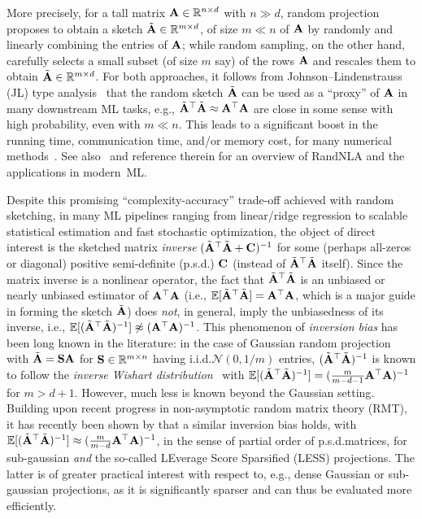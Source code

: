 \documentclass[11pt,a4paper]{article}
\begin{document}
More precisely, for a tall matrix $\mathbf{A} \in {\mathbb{R}}^{n \times d}$ with $n \gg d$, random projection proposes to obtain a sketch $\tilde {\mathbf{A}} \in {\mathbb{R}}^{m \times d}$, of size $m \ll n$ of $\mathbf{A}$ by randomly and linearly combining the entries of $\mathbf{A}$; while 
random sampling, on the other hand, carefully selects a small  subset (of size $m$ say) of the rows $\mathbf{A}$ and rescales them to obtain $\tilde {\mathbf{A}} \in {\mathbb{R}}^{m \times d}$.
For both approaches, it follows from Johnson--Lindenstrauss (JL) type analysis~\citep{johnson1984extensions} that the random sketch $\tilde {\mathbf{A}}$ can be used as a ``proxy'' of $\mathbf{A}$ in many downstream ML tasks, e.g., $\tilde {\mathbf{A}}^\top \tilde {\mathbf{A}} \approx \mathbf{A}^\top \mathbf{A}$ are close in some sense with high probability, even with $m \ll n$.
This leads to a significant boost in the running time, communication time, and/or memory cost, for many numerical methods~\citep{drineas2006sampling,drineas2011faster,drineas2012fast,avron2017faster,DM21_NoticesAMS,lacotte2022adaptive}.
See also~\citet{mahoney2011randomized,halko2011finding,david2014sketching,RandNLA_PCMIchapter_chapter,martinsson2020randomized,DM21_NoticesAMS,randlapack_book_v2_arxiv,randnla_kdd24_TR} and reference therein for an overview of RandNLA and the applications in modern~ML.

Despite this promising ``complexity-accuracy'' trade-off achieved with random sketching, in many ML pipelines ranging from linear/ridge regression to scalable statistical estimation and fast stochastic optimization, the object of direct interest is the sketched matrix \emph{inverse} $(\tilde{\mathbf{A}}^\top \tilde {\mathbf{A}} + \mathbf{C})^{-1}$ for some (perhaps all-zeros or diagonal) positive semi-definite (p.s.d.) $\mathbf{C}$ (instead of $\tilde {\mathbf{A}}^\top \tilde {\mathbf{A}}$ itself).
Since the matrix inverse is a nonlinear operator, the fact that $\tilde {\mathbf{A}}^\top \tilde {\mathbf{A}}$ is an unbiased or nearly unbiased estimator of $\mathbf{A}^\top \mathbf{A}$ (i.e., ${\mathbb{E}}[\tilde {\mathbf{A}}^\top \tilde {\mathbf{A}}] = \mathbf{A}^\top \mathbf{A}$, which is a major guide in forming the sketch $\tilde {\mathbf{A}}$) does \emph{not}, in general, imply the unbiasedness of its inverse, i.e., ${\mathbb{E}}[ (\tilde {\mathbf{A}}^\top \tilde {\mathbf{A}})^{-1} ] \not \approx (\mathbf{A}^\top \mathbf{A})^{-1}$.
This phenomenon of \emph{inversion bias} has been long known in the literature: in the case of Gaussian random projection with $\tilde {\mathbf{A}} = \mathbf{S} \mathbf{A}$ for $\mathbf{S} \in {\mathbb{R}}^{m \times n}$ having i.i.d.\@ $\mathcal N(0,1/m)$ entries, $(\tilde {\mathbf{A}}^\top \tilde {\mathbf{A}})^{-1}$ is known to follow the \emph{inverse Wishart distribution}~\citep{haff1979identity} with ${\mathbb{E}}[(\tilde {\mathbf{A}}^\top \tilde {\mathbf{A}})^{-1}] =  ( \frac{m}{m - d -1} \mathbf{A}^\top \mathbf{A})^{-1}$ for $m > d +1$.
However, much less is known beyond the Gaussian setting.
Building upon recent progress in non-asymptotic random matrix theory (RMT), it has recently been shown by \citet{derezinski2021sparse} that a similar inversion bias holds, with ${\mathbb{E}}[(\tilde {\mathbf{A}}^\top \tilde {\mathbf{A}})^{-1}] \approx ( \frac{m}{m - d} \mathbf{A}^\top \mathbf{A})^{-1}$, in the sense of partial order of p.s.d.\@ matrices, for sub-gaussian \emph{and} the so-called LEverage Score Sparsified (LESS) projections. 
The latter is of greater practical interest with respect to, e.g., dense Gaussian or sub-gaussian projections, as it is significantly sparser and can thus be evaluated more efficiently.
\end{document}
